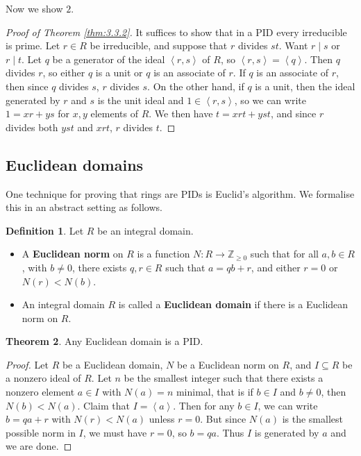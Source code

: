 \documentclass{article}
\newcommand{\Z}{\mathbb{Z}}
\newcommand{\rb}[1]{\left( #1 \right)}
\newcommand{\ab}[1]{\left\langle #1 \right\rangle}
\theoremstyle{definition}\newtheorem{definition}{Definition}[subsection]
\theoremstyle{definition}\newtheorem{remark}[definition]{Remark}
\theoremstyle{definition}\newtheorem*{example}{Example}
\theoremstyle{definition}\newtheorem*{note}{Note}
\newtheorem{theorem}[definition]{Theorem}
\begin{document}
Now we show $ 2 $.

\begin{proof}[Proof of Theorem \ref{thm:3.3.2}]
It suffices to show that in a PID every irreducible is prime. Let $ r \in R $ be irreducible, and suppose that $ r $ divides $ st $. Want $ r \mid s $ or $ r \mid t $. Let $ q $ be a generator of the ideal $ \ab{r, s} $ of $ R $, so $ \ab{r, s} = \ab{q} $. Then $ q $ divides $ r $, so either $ q $ is a unit or $ q $ is an associate of $ r $. If $ q $ is an associate of $ r $, then since $ q $ divides $ s $, $ r $ divides $ s $. On the other hand, if $ q $ is a unit, then the ideal generated by $ r $ and $ s $ is the unit ideal and $ 1 \in \ab{r, s} $, so we can write $ 1 = xr + ys $ for $ x, y $ elements of $ R $. We then have $ t = xrt + yst $, and since $ r $ divides both $ yst $ and $ xrt $, $ r $ divides $ t $.
\end{proof}


\subsection{Euclidean domains}

One technique for proving that rings are PIDs is Euclid's algorithm. We formalise this in an abstract setting as follows.

\begin{definition}
Let $ R $ be an integral domain.
\begin{itemize}
\item A \textbf{Euclidean norm} on $ R $ is a function $ N : R \to \Z_{\ge 0} $ such that for all $ a, b \in R $, with $ b \ne 0 $, there exists $ q, r \in R $ such that $ a = qb + r $, and either $ r = 0 $ or $ N\rb{r} < N\rb{b} $.
\item An integral domain $ R $ is called a \textbf{Euclidean domain} if there is a Euclidean norm on $ R $.
\end{itemize}
\end{definition}

\begin{theorem}
Any Euclidean domain is a PID.
\end{theorem}

\begin{proof}
Let $ R $ be a Euclidean domain, $ N $ be a Euclidean norm on $ R $, and $ I \subseteq R $ be a nonzero ideal of $ R $. Let $ n $ be the smallest integer such that there exists a nonzero element $ a \in I $ with $ N\rb{a} = n $ minimal, that is if $ b \in I $ and $ b \ne 0 $, then $ N\rb{b} < N\rb{a} $. Claim that $ I = \ab{a} $. Then for any $ b \in I $, we can write $ b = qa + r $ with $ N\rb{r} < N\rb{a} $ unless $ r = 0 $. But since $ N\rb{a} $ is the smallest possible norm in $ I $, we must have $ r = 0 $, so $ b = qa $. Thus $ I $ is generated by $ a $ and we are done.
\end{proof}
\end{document}

